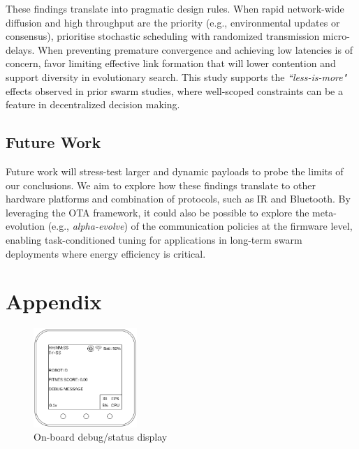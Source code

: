\documentclass[conference]{IEEEtran}
\begin{document}
These findings translate into pragmatic design rules. When rapid network-wide diffusion and high throughput are the priority (e.g., environmental updates or consensus), prioritise stochastic scheduling with randomized transmission micro-delays. When preventing premature convergence and achieving low latencies is of concern, favor limiting effective link formation that will lower contention and support diversity in evolutionary search. This study supports the \emph{“less-is-more"} effects observed in prior swarm studies, where well-scoped constraints can be a feature in decentralized decision making.

\subsection{Future Work}

Future work will stress-test larger and dynamic payloads to probe the limits of our conclusions. We aim to explore how these findings translate to other hardware platforms and combination of protocols, such as IR and Bluetooth. By leveraging the OTA framework, it could also be possible to explore the meta-evolution (e.g., \emph{alpha-evolve}) of the communication policies at the firmware level, enabling task-conditioned tuning for applications in long-term swarm deployments where energy efficiency is critical.

\printbibliography
\section{Appendix}
\begin{figure}[H]
    \centering
    \includegraphics[width=0.35\textwidth]{UI.png}
    \caption{On-board debug/status display}
    \label{fig:UI}
\end{figure}
\end{document}
